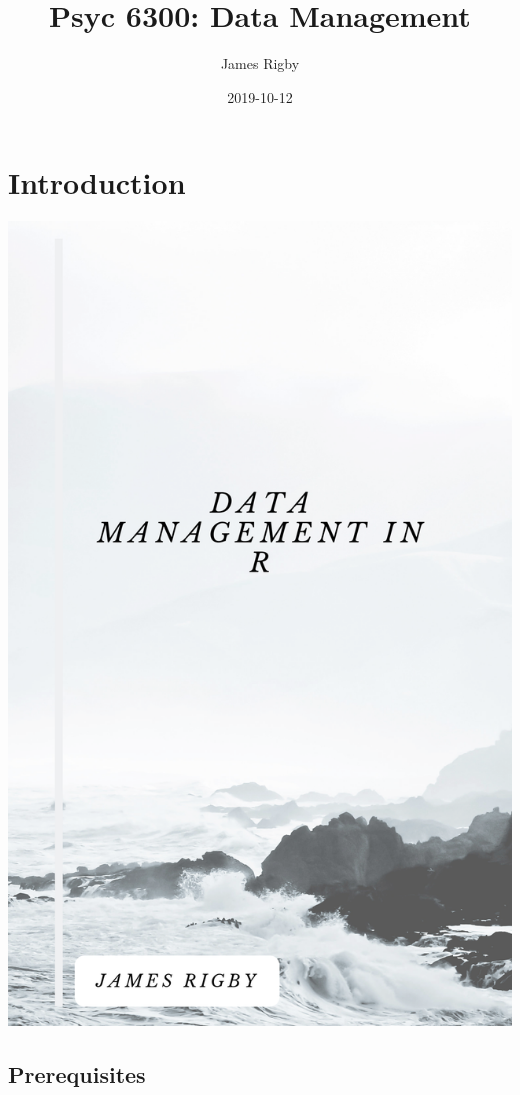 \documentclass[]{book}
\title{Psyc 6300: Data Management}
\author{James Rigby}
\date{2019-10-12}
\theoremstyle{definition}
\theoremstyle{definition}
\theoremstyle{definition}
\theoremstyle{remark}
\begin{document}
\maketitle

{
\setcounter{tocdepth}{1}
\tableofcontents
}
\hypertarget{introduction}{%
\chapter{Introduction}\label{introduction}}

\includegraphics[width=19.58in]{suppl/cover}

\hypertarget{prerequisites}{%
\section{Prerequisites}\label{prerequisites}}
\end{document}
